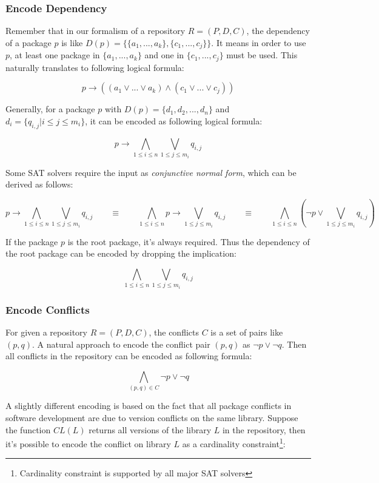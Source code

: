\subsubsection{Encode Dependency}

Remember that in our formalism of a repository $R = (P, D, C)$, the dependency of a package $p$ is like $D(p) = \{\{a_1, ..., a_k\}, \{c_1, ..., c_j\}\}$. It means in order to use $p$, at least one package in $\{a_1, ..., a_k\}$ and one in $\{c_1, ..., c_j\}$ must be used. This naturally translates to following logical formula:

\[
p \rightarrow ((a_1 \vee ... \vee a_k) \wedge (c_1 \vee ... \vee c_j))
\]

Generally, for a package $p$ with $D(p) = \{ d_1, d_2, ..., d_n\}$ and $d_i = \{ q_{i, j} | i \leq j \leq m_i \}$, it can be encoded as following logical formula:

\[
p \rightarrow \bigwedge_{1 \leq i \leq n} \bigvee_{1 \leq j \leq m_i} q_{i,j}
\]

Some SAT solvers require the input as \emph{conjunctive normal form}, which can be derived as follows:

\[
p \rightarrow \bigwedge_{1 \leq i \leq n} \bigvee_{1 \leq j \leq m_i} q_{i,j}
\quad \quad \equiv \quad \quad
\bigwedge_{1 \leq i \leq n} p \rightarrow \bigvee_{1 \leq j \leq m_i} q_{i,j}
\quad \quad \equiv \quad \quad
\bigwedge_{1 \leq i \leq n} (\neg p \vee \bigvee_{1 \leq j \leq m_i} q_{i,j})
\]

If the package $p$ is the root package, it's always required. Thus the dependency of the root package can be encoded by dropping the implication:

\[
\bigwedge_{1 \leq i \leq n} \bigvee_{1 \leq j \leq m_i} q_{i,j}
\]

\subsubsection{Encode Conflicts}

For given a repository $R = (P, D, C)$, the conflicts $C$ is a set of pairs like $(p, q)$. A natural approach to encode the conflict pair $(p, q)$ as $\neg p \vee \neg q$. Then all conflicts in the repository can be encoded as following formula:

\[
\bigwedge_{(p, q) \in C} \neg p \vee \neg q
\]

A slightly different encoding is based on the fact that all package conflicts in software development are due to version conflicts on the same library. Suppose the function $CL(L)$ returns all versions of the library $L$ in the repository, then it's possible to encode the conflict on library $L$ as a cardinality constraint\footnote{Cardinality constraint is supported by all major SAT solvers}:

